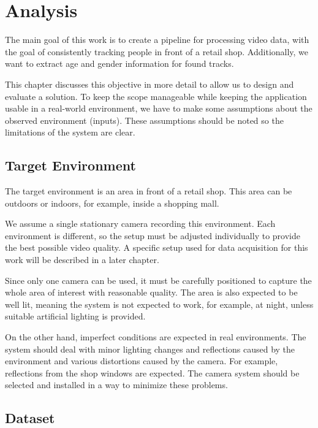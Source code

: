 \chapter{Analysis}\label{ch:analysis}


The main goal of this work is to create a pipeline for processing video data, with the goal of consistently tracking people in front of a retail shop. Additionally, we want to extract age and gender information for found tracks.

This chapter discusses this objective in more detail to allow us to design and evaluate a solution. To keep the scope manageable while keeping the application usable in a real-world environment, we have to make some assumptions about the observed environment (inputs). These assumptions should be noted so the limitations of the system are clear.

\section{Target Environment}

The target environment is an area in front of a retail shop. This area can be outdoors or indoors, for example, inside a shopping mall.

We assume a single stationary camera recording this environment. Each environment is different, so the setup must be adjusted individually to provide the best possible video quality. A specific setup used for data acquisition for this work will be described in a later chapter.

Since only one camera can be used, it must be carefully positioned to capture the whole area of interest with reasonable quality. The area is also expected to be well lit, meaning the system is not expected to work, for example, at night, unless suitable artificial lighting is provided.

On the other hand, imperfect conditions are expected in real environments. The system should deal with minor lighting changes and reflections caused by the environment and various distortions caused by the camera. For example, reflections from the shop windows are expected. The camera system should be selected and installed in a way to minimize these problems.

\section{Dataset}\label{s:dataset}

